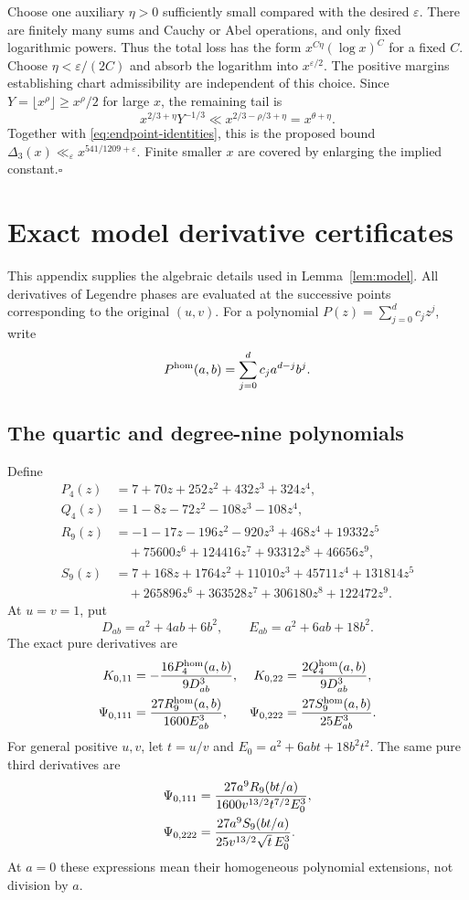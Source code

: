 \documentclass[11pt,a4paper]{article}
\numberwithin{equation}{section}
\theoremstyle{remark}
\newcommand{\eps}{\varepsilon}
\begin{document}
Choose one auxiliary $\eta>0$ sufficiently small compared with the desired
$\eps$. There are finitely many sums and Cauchy or Abel operations, and
only fixed logarithmic powers. Thus the total loss has the form
$x^{C\eta}(\log x)^C$ for a fixed $C$. Choose $\eta<\eps/(2C)$ and absorb
the logarithm into $x^{\eps/2}$. The positive margins establishing chart
admissibility are independent of this choice. Since
$Y=\lfloor x^\rho\rfloor\ge x^\rho/2$ for large $x$, the remaining tail is
\[
 x^{2/3+\eta}Y^{-1/3}
 \ll x^{2/3-\rho/3+\eta}=x^{\theta+\eta}.
\]
Together with \eqref{eq:endpoint-identities}, this is the proposed bound
$\Delta_3(x)\ll_\eps x^{541/1209+\eps}$. Finite smaller $x$ are covered by
enlarging the implied constant.\hfill$\square$

\appendix
\section{Exact model derivative certificates}
\label{app:model}
This appendix supplies the algebraic details used in
Lemma~\ref{lem:model}. All derivatives of Legendre phases are evaluated
at the successive points corresponding to the original $(u,v)$.
For a polynomial $P(z)=\sum_{j=0}^d c_jz^j$, write
\[
 P^{\rm hom}(a,b)=\sum_{j=0}^d c_j a^{d-j}b^j.
\]

\subsection{The quartic and degree-nine polynomials}
Define
\begin{align*}
 P_4(z)&=7+70z+252z^2+432z^3+324z^4,\\
 Q_4(z)&=1-8z-72z^2-108z^3-108z^4,\\
 R_9(z)&=-1-17z-196z^2-920z^3+468z^4+19332z^5\\
       &\quad+75600z^6+124416z^7+93312z^8+46656z^9,\\
 S_9(z)&=7+168z+1764z^2+11010z^3+45711z^4+131814z^5\\
       &\quad+265896z^6+363528z^7+306180z^8+122472z^9.
\end{align*}
At $u=v=1$, put
\[
 D_{ab}=a^2+4ab+6b^2,\qquad E_{ab}=a^2+6ab+18b^2.
\]
The exact pure derivatives are
\begin{align}
 K_{0,11}&=-\frac{16P_4^{\rm hom}(a,b)}{9D_{ab}^3},
 &K_{0,22}&=\frac{2Q_4^{\rm hom}(a,b)}{9D_{ab}^3},
                    \label{eq:Kquartics}\\
 \Psi_{0,111}&=\frac{27R_9^{\rm hom}(a,b)}{1600E_{ab}^3},
 &\Psi_{0,222}&=\frac{27S_9^{\rm hom}(a,b)}{25E_{ab}^3}.
                    \label{eq:Psi-at-one}
\end{align}
For general positive $u,v$, let $t=u/v$ and
$E_0=a^2+6abt+18b^2t^2$. The same pure third derivatives are
\begin{align}
 \Psi_{0,111}
   &=\frac{27a^9 R_9(bt/a)}{1600v^{13/2}t^{7/2}E_0^3},\notag\\
 \Psi_{0,222}
   &=\frac{27a^9 S_9(bt/a)}{25v^{13/2}\sqrt t\,E_0^3}.
                  \label{eq:Psi-general}
\end{align}
At $a=0$ these expressions mean their homogeneous polynomial extensions,
not division by $a$.
\end{document}
